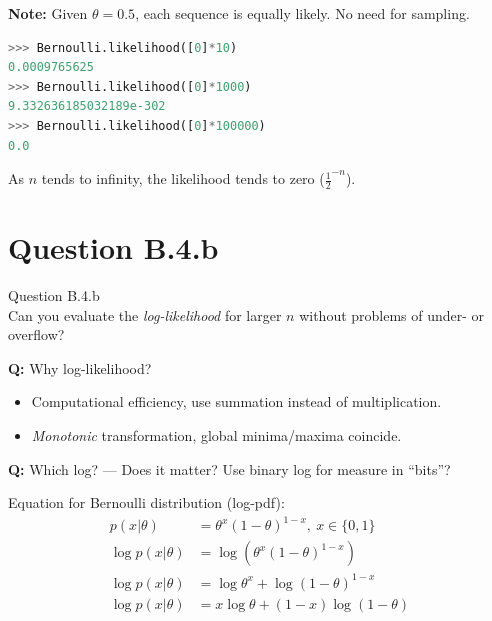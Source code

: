 \documentclass[usenames,dvipsnames,table]{beamer}
\begin{document}
\begin{frame}[fragile]
\textbf{Note:} Given $\theta=0.5$, each sequence is equally likely. No need for sampling.
\begin{lstlisting}[language=Python]
>>> Bernoulli.likelihood([0]*10)
0.0009765625
>>> Bernoulli.likelihood([0]*1000)
9.332636185032189e-302
>>> Bernoulli.likelihood([0]*100000)
0.0
\end{lstlisting}

As $n$ tends to infinity, the likelihood tends to zero ($\frac{1}{2}^{-n}$).
\end{frame}




\section{Question B.4.b}
\begin{frame}
\begin{center}
{\huge{Question B.4.b}}
\\\vspace{2em}
Can you evaluate the \emph{log-likelihood} for larger $n$ without problems of under- or overflow?
\end{center}
\end{frame}

\begin{frame}
\textbf{Q:} Why log-likelihood?
\begin{itemize}
\item Computational efficiency, use summation instead of multiplication.
\item \emph{Monotonic} transformation, global minima/maxima coincide.
\end{itemize}

\textbf{Q:} Which log? --- Does it matter? Use binary log for measure in ``bits''?
\end{frame}

\begin{frame}
Equation for Bernoulli distribution (log-pdf):
\begin{align*}
p(x|\theta) &= \theta^{x} (1-\theta)^{1-x},\ x \in \{0, 1\}\\
\log p(x|\theta) &= \log(\theta^{x} (1-\theta)^{1-x})\\
\log p(x|\theta) &= \log\theta^{x}+\log(1-\theta)^{1-x}\\
\log p(x|\theta) &= x\log\theta+(1-x)\log(1-\theta)
\end{align*}
\end{frame}
\end{document}
